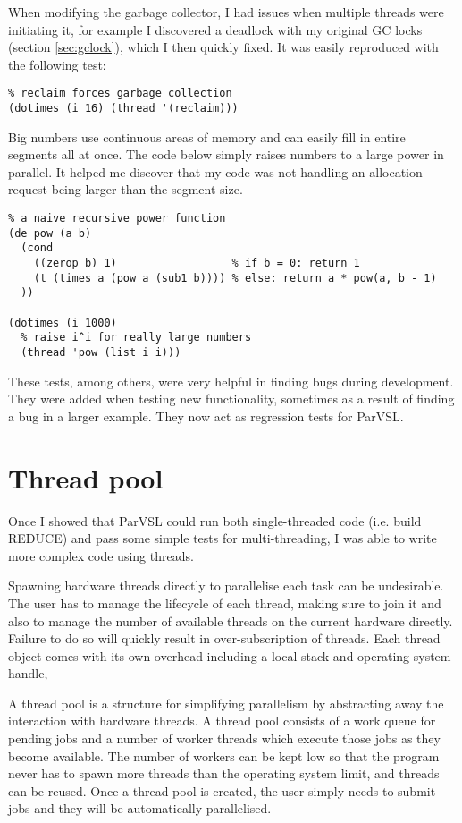 When modifying the garbage collector, I had issues when multiple
threads were initiating it, for example I discovered a deadlock
with my original GC locks (section \ref{sec:gclock}), which I then
quickly fixed. It was easily reproduced with the following test:

\begin{verbatim}
% reclaim forces garbage collection
(dotimes (i 16) (thread '(reclaim)))
\end{verbatim}

Big numbers use continuous areas of memory and can easily
fill in entire segments all at once. The code below simply
raises numbers to a large power in parallel. It helped me discover
that my code was not handling an allocation request being
larger than the segment size.


\begin{verbatim}
% a naive recursive power function
(de pow (a b)
  (cond
    ((zerop b) 1)                  % if b = 0: return 1
    (t (times a (pow a (sub1 b)))) % else: return a * pow(a, b - 1)
  ))

(dotimes (i 1000)
  % raise i^i for really large numbers
  (thread 'pow (list i i)))
\end{verbatim}

These tests, among others, were very helpful in finding bugs
during development. They were added when testing new functionality,
sometimes as a result of finding a bug in a larger example.
They now act as regression tests for ParVSL.

\section{Thread pool}

Once I showed  that ParVSL could run both single-threaded code (i.e. build REDUCE) and pass some
simple tests for multi-threading, I was able to write more complex code using threads.

Spawning hardware threads directly to parallelise each task can be undesirable. The user has
to manage the lifecycle of each thread, making sure to join it and also to manage the number
of available threads on the current hardware directly. Failure to do so will quickly result in
over-subscription of threads. Each thread object comes with its own overhead including a local
stack and operating system handle,

A thread pool is a structure for simplifying parallelism by abstracting away the interaction
with hardware threads. A thread pool consists of a work queue for pending jobs and a number
of worker threads which execute those jobs as they become available. The number of workers
can be kept low so that the program never has to spawn more threads
than the operating system limit, and threads can be reused. Once a thread pool is created,
the user simply needs to submit jobs and they will be automatically parallelised.

